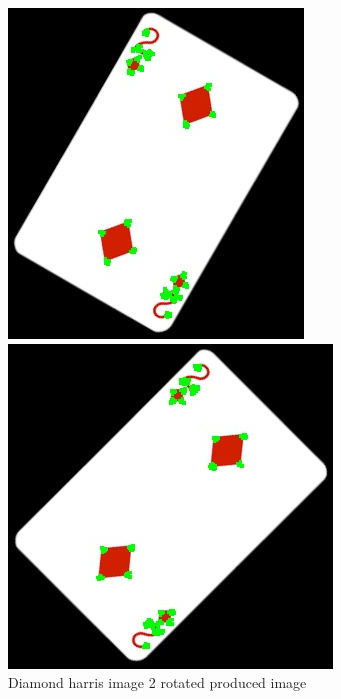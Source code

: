 \documentclass[conference]{IEEEtran}
\begin{document}
\begin{figure}[!htb]
\begin{minipage}[b]{0.2\textwidth}
    \includegraphics[width=\textwidth]{../programme/results/Task_1/rotated_experiements/Harris/diamond/image_2.jpg}
    \caption{Diamond harris image 2 rotated produced image}
    \label{Diamond harris image 2 rotated produced image}
  \end{minipage}
  \hfill
    \begin{minipage}[b]{0.2\textwidth}
    \includegraphics[width=\textwidth]{../programme/results/Task_1/rotated_experiements/Harris/diamond/image_3.jpg}

\end{minipage}
\end{figure}
\end{document}
